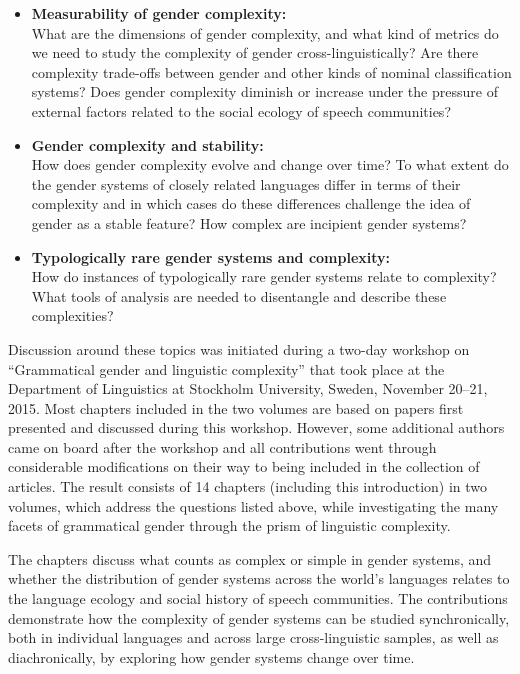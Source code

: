 \documentclass[output=collectionpaper]{langsci/langscibook}
\begin{document}
\begin{itemize}
\item \textbf{Measurability of gender complexity:}\\
What are the dimensions of gender complexity, and what kind of metrics do we need to study the complexity of gender cross-linguistically? Are there complexity trade-offs between gender and other kinds of nominal classification systems? Does gender complexity diminish or increase under the pressure of external factors related to the social ecology of speech communities?
\item \textbf{Gender complexity and stability:}\\
How does gender complexity evolve and change over time? To what extent do the gender systems of closely related languages differ in terms of their complexity and in which cases do these differences challenge the idea of gender as a stable feature? How complex are incipient gender systems?
\item \textbf{Typologically rare gender systems and complexity:}\\
How do instances of typologically rare gender systems relate to complexity? What tools of analysis are needed to disentangle and describe these complexities?
\end{itemize}

\noindent Discussion around these topics was initiated during a two-day workshop on ``Grammatical gender and linguistic complexity'' that took place at the Department of Linguistics at Stockholm University, Sweden, November 20--21, 2015. Most chapters included in the two volumes are based on papers first presented and discussed during this workshop. However, some additional authors came on board after the workshop and all contributions went through considerable modifications on their way to being included in the collection of articles. The result consists of 14 chapters (including this introduction) in two volumes, which address the questions listed above, while investigating the many facets of grammatical gender through the prism of linguistic complexity.

The chapters discuss what counts as complex or simple in gender systems, and whether the distribution of gender systems across the world’s languages relates to the language ecology and social history of speech communities. The contributions demonstrate how the complexity of gender systems can be studied synchronically, both in individual languages and across large cross-linguistic samples, as well as diachronically, by exploring how gender systems change over time.
\end{document}
